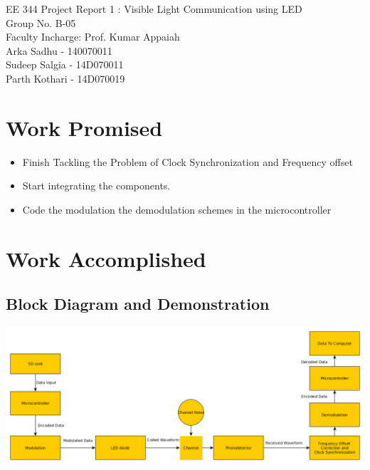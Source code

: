 \documentclass{article}
\begin{document}

EE 344 Project Report 1 : Visible Light Communication using LED\\
Group No. B-05\\
Faculty Incharge: Prof. Kumar Appaiah\\
Arka Sadhu - 140070011\\
Sudeep Salgia - 14D070011\\
Parth Kothari - 14D070019\\
\vspace{-1.0cm}

\section{Work Promised}

\begin{itemize}
\item Finish Tackling the Problem of Clock Synchronization and Frequency offset
\item Start integrating the components.
\item Code the modulation the demodulation schemes in the microcontroller
\end{itemize}

\section{Work Accomplished }

\subsection{Block Diagram and Demonstration}
\includegraphics[scale=0.3]{functional_flow}
\\%
\end{document}
